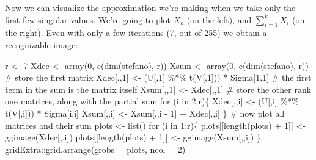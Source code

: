 \documentclass[
  letterpaper,
  DIV=11,
  numbers=noendperiod]{scrreprt}
\newenvironment{Shaded}{\begin{snugshade}}{\end{snugshade}}
\newcommand{\AttributeTok}[1]{\textcolor[rgb]{0.40,0.45,0.13}{#1}}
\newcommand{\CommentTok}[1]{\textcolor[rgb]{0.37,0.37,0.37}{#1}}
\newcommand{\ControlFlowTok}[1]{\textcolor[rgb]{0.00,0.23,0.31}{#1}}
\newcommand{\DecValTok}[1]{\textcolor[rgb]{0.68,0.00,0.00}{#1}}
\newcommand{\FunctionTok}[1]{\textcolor[rgb]{0.28,0.35,0.67}{#1}}
\newcommand{\NormalTok}[1]{\textcolor[rgb]{0.00,0.23,0.31}{#1}}
\newcommand{\OtherTok}[1]{\textcolor[rgb]{0.00,0.23,0.31}{#1}}
\newcommand{\SpecialCharTok}[1]{\textcolor[rgb]{0.37,0.37,0.37}{#1}}
\begin{document}
Now we can visualize the approximation we're making when we take only
the first few singular values. We're going to plot \(X_k\) (on the
left), and \(\sum_{i=1}^k X_i\) (on the right). Even with only a few
iterations (7, out of 255) we obtain a recognizable image:

\begin{Shaded}
\begin{Highlighting}[]
\NormalTok{r }\OtherTok{\textless{}{-}} \DecValTok{7}
\NormalTok{Xdec }\OtherTok{\textless{}{-}} \FunctionTok{array}\NormalTok{(}\DecValTok{0}\NormalTok{, }\FunctionTok{c}\NormalTok{(}\FunctionTok{dim}\NormalTok{(stefano), r))}
\NormalTok{Xsum }\OtherTok{\textless{}{-}} \FunctionTok{array}\NormalTok{(}\DecValTok{0}\NormalTok{, }\FunctionTok{c}\NormalTok{(}\FunctionTok{dim}\NormalTok{(stefano), r))}
\CommentTok{\# store the first matrix}
\NormalTok{Xdec[,,}\DecValTok{1}\NormalTok{] }\OtherTok{\textless{}{-}}\NormalTok{ (U[,}\DecValTok{1}\NormalTok{] }\SpecialCharTok{\%*\%} \FunctionTok{t}\NormalTok{(V[,}\DecValTok{1}\NormalTok{])) }\SpecialCharTok{*}\NormalTok{ Sigma[}\DecValTok{1}\NormalTok{,}\DecValTok{1}\NormalTok{]}
\CommentTok{\# the first term in the sum is the matrix itself}
\NormalTok{Xsum[,,}\DecValTok{1}\NormalTok{] }\OtherTok{\textless{}{-}}\NormalTok{ Xdec[,,}\DecValTok{1}\NormalTok{]}
\CommentTok{\# store the other rank one matrices, along with the partial sum}
\ControlFlowTok{for}\NormalTok{ (i }\ControlFlowTok{in} \DecValTok{2}\SpecialCharTok{:}\NormalTok{r)\{}
\NormalTok{  Xdec[,,i] }\OtherTok{\textless{}{-}}\NormalTok{ (U[,i] }\SpecialCharTok{\%*\%} \FunctionTok{t}\NormalTok{(V[,i])) }\SpecialCharTok{*}\NormalTok{ Sigma[i,i]}
\NormalTok{  Xsum[,,i] }\OtherTok{\textless{}{-}}\NormalTok{ Xsum[,,i }\SpecialCharTok{{-}} \DecValTok{1}\NormalTok{] }\SpecialCharTok{+}\NormalTok{ Xdec[,,i]}
\NormalTok{\}}
\CommentTok{\# now plot all matrices and their sum}
\NormalTok{plots }\OtherTok{\textless{}{-}} \FunctionTok{list}\NormalTok{()}
\ControlFlowTok{for}\NormalTok{ (i }\ControlFlowTok{in} \DecValTok{1}\SpecialCharTok{:}\NormalTok{r)\{}
\NormalTok{  plots[[}\FunctionTok{length}\NormalTok{(plots) }\SpecialCharTok{+} \DecValTok{1}\NormalTok{]] }\OtherTok{\textless{}{-}} \FunctionTok{ggimage}\NormalTok{(Xdec[,,i])}
\NormalTok{  plots[[}\FunctionTok{length}\NormalTok{(plots) }\SpecialCharTok{+} \DecValTok{1}\NormalTok{]] }\OtherTok{\textless{}{-}} \FunctionTok{ggimage}\NormalTok{(Xsum[,,i])}
\NormalTok{\}}
\NormalTok{gridExtra}\SpecialCharTok{::}\FunctionTok{grid.arrange}\NormalTok{(}\AttributeTok{grobs =}\NormalTok{ plots, }\AttributeTok{ncol =} \DecValTok{2}\NormalTok{)}
\end{Highlighting}
\end{Shaded}
\end{document}
